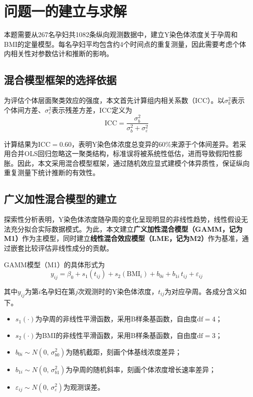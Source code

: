 \documentclass[withoutpreface]{cumcmthesis}
\begin{document}
\section{问题一的建立与求解}

本题需要从267名孕妇共1082条纵向观测数据中，建立Y染色体浓度关于孕周和BMI的定量模型。每名孕妇平均包含约4个时间点的重复测量，因此需要考虑个体内相关性对参数估计和推断的影响。

\subsection{混合模型框架的选择依据}

为评估个体层面聚类效应的强度，本文首先计算组内相关系数（ICC）。以$\sigma^2_b$表示个体间方差、$\sigma^2_\varepsilon$表示残差方差，ICC定义为
\begin{equation}
  \mathrm{ICC} = \frac{\sigma^2_b}{\sigma^2_b + \sigma^2_\varepsilon}
\end{equation}

计算结果为$\mathrm{ICC}=0.60$，表明Y染色体浓度总变异的60\%来源于个体间差异。若采用合并OLS回归忽略这一聚类结构，标准误将被系统性低估，进而导致假阳性膨胀。因此，本文采用混合模型框架，通过随机效应显式建模个体异质性，保证纵向重复测量下统计推断的有效性。

\subsection{广义加性混合模型的建立}

探索性分析表明，Y染色体浓度随孕周的变化呈现明显的非线性趋势，线性假设无法充分拟合实际数据模式。为此，本文建立\textbf{广义加性混合模型（GAMM，记为M1）}作为主模型，同时建立\textbf{线性混合效应模型（LME，记为M2）}作为基准，通过嵌套比较评估非线性成分的贡献。

GAMM模型（M1）的具体形式为
\begin{equation}\label{eq:gamm}
  y_{ij} = \beta_0 + s_1(t_{ij}) + s_2(\mathrm{BMI}_i) + b_{0i} + b_{1i}\,t_{ij} + \varepsilon_{ij}
\end{equation}

其中$y_{ij}$为第$i$名孕妇在第$j$次观测时的Y染色体浓度，$t_{ij}$为对应孕周。各成分含义如下。

\begin{itemize}
  \item $s_1(\cdot)$为孕周的非线性平滑函数，采用B样条基函数，自由度$\mathrm{df}=4$；
  \item $s_2(\cdot)$为BMI的非线性平滑函数，采用B样条基函数，自由度$\mathrm{df}=3$；
  \item $b_{0i} \sim N(0,\,\sigma^2_{b0})$为随机截距，刻画个体基线浓度差异；
  \item $b_{1i} \sim N(0,\,\sigma^2_{b1})$为孕周的随机斜率，刻画个体浓度增长速率差异；
  \item $\varepsilon_{ij} \sim N(0,\,\sigma^2_\varepsilon)$为观测误差。
\end{itemize}
\end{document}
